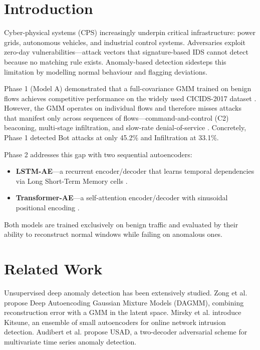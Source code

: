 \documentclass[conference]{IEEEtran}
\begin{document}
\section{Introduction}

Cyber-physical systems (CPS) increasingly underpin critical infrastructure: power grids,
autonomous vehicles, and industrial control systems. Adversaries exploit zero-day
vulnerabilities—attack vectors that signature-based IDS cannot detect because no matching rule
exists. Anomaly-based detection sidesteps this limitation by modelling normal behaviour and
flagging deviations.

Phase 1 (Model A) demonstrated that a full-covariance GMM trained on benign flows achieves
competitive performance on the widely used CICIDS-2017 dataset \cite{sharafaldin2018}. However,
the GMM operates on individual flows and therefore misses attacks that manifest only across
sequences of flows—command-and-control (C2) beaconing, multi-stage infiltration, and slow-rate
denial-of-service \cite{mirsky2018kitsune}. Concretely, Phase 1 detected Bot attacks at only
45.2\% and Infiltration at 33.1\%.

Phase 2 addresses this gap with two sequential autoencoders:
\begin{itemize}
  \item \textbf{LSTM-AE}—a recurrent encoder/decoder that learns temporal dependencies via
        Long Short-Term Memory cells \cite{hochreiter1997lstm}.
  \item \textbf{Transformer-AE}—a self-attention encoder/decoder with sinusoidal positional
        encoding \cite{vaswani2017attention}.
\end{itemize}
Both models are trained exclusively on benign traffic and evaluated by their ability to
reconstruct normal windows while failing on anomalous ones.

\section{Related Work}

Unsupervised deep anomaly detection has been extensively studied. Zong et al. \cite{zong2018dagmm}
propose Deep Autoencoding Gaussian Mixture Models (DAGMM), combining reconstruction error with
a GMM in the latent space. Mirsky et al. \cite{mirsky2018kitsune} introduce Kitsune, an ensemble
of small autoencoders for online network intrusion detection. Audibert et al. \cite{audibert2020usad}
propose USAD, a two-decoder adversarial scheme for multivariate time series anomaly detection.
\end{document}
